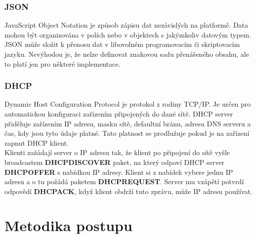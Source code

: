 \documentclass[a4paper, 12pt]{report}
\begin{document}
    \subsection{JSON}
    JavaScript Object Notation je způsob zápisu dat nezávislých na platformě. Data mohou být organizována v polích nebo v objektech s jakýmkoliv datovým typem. JSON může složit k přenosu dat v libovolném programovacím či skriptovacím jazyku. Nevýhodou je, že nelze definovat znakovou sadu přenášeného obsahu, ale to platí jen pro některé implementace.

    \subsection{DHCP}
    Dynamic Host Configuration Protocol je protokol z rodiny TCP/IP. Je určen pro automatickou konfiguraci zařízením připojených do dané sítě. DHCP server přiděluje zařízením IP adresu, masku sítě, defaultní bránu, adresu DNS serveru a čas, kdy jsou tyto údaje platné. Tato platnost se prodlužuje pokud je na zařízení zapnut DHCP klient.\\
    Klienti zažádají server o IP adresu tak, že klient po připojení do sítě vyšle broadcastem \textbf{DHCPDISCOVER} paket, na který odpoví DHCP server \textbf{DHCPOFFER} s nabídkou IP adresy. Klient si z nabídek vybere jednu IP adresu a o tu požádá paketem \textbf{DHCPREQUEST}. Server mu vzápětí potvrdí odpovědí \textbf{DHCPACK}, když klient obdrží tuto zprávu, může IP adresu používat.


    \chapter{Metodika postupu}
\end{document}

